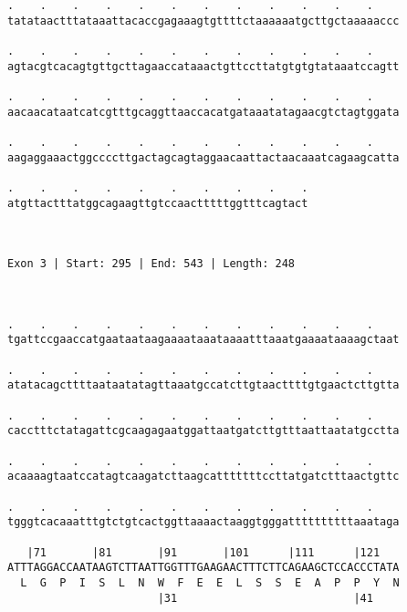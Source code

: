 \documentclass{article}
\begin{document}
\begin{Verbatim}
.    .    .    .    .    .    .    .    .    .    .    .    
tatataactttataaattacaccgagaaagtgttttctaaaaaatgcttgctaaaaaccc
                                                            
.    .    .    .    .    .    .    .    .    .    .    .    
agtacgtcacagtgttgcttagaaccataaactgttccttatgtgtgtataaatccagtt
                                                            
.    .    .    .    .    .    .    .    .    .    .    .    
aacaacataatcatcgtttgcaggttaaccacatgataaatatagaacgtctagtggata
                                                            
.    .    .    .    .    .    .    .    .    .    .    .    
aagaggaaactggccccttgactagcagtaggaacaattactaacaaatcagaagcatta
                                                            
.    .    .    .    .    .    .    .    .    .
atgttactttatggcagaagttgtccaactttttggtttcagtact
                                              
                                              
 
Exon 3 | Start: 295 | End: 543 | Length: 248



.    .    .    .    .    .    .    .    .    .    .    .    
tgattccgaaccatgaataataagaaaataaataaaatttaaatgaaaataaaagctaat
                                                            
.    .    .    .    .    .    .    .    .    .    .    .    
atatacagcttttaataatatagttaaatgccatcttgtaacttttgtgaactcttgtta
                                                            
.    .    .    .    .    .    .    .    .    .    .    .    
cacctttctatagattcgcaagagaatggattaatgatcttgtttaattaatatgcctta
                                                            
.    .    .    .    .    .    .    .    .    .    .    .    
acaaaagtaatccatagtcaagatcttaagcatttttttccttatgatctttaactgttc
                                                            
.    .    .    .    .    .    .    .    .    .    .    .    
tgggtcacaaatttgtctgtcactggttaaaactaaggtgggattttttttttaaataga
                                                            
   |71       |81       |91       |101      |111      |121   
ATTTAGGACCAATAAGTCTTAATTGGTTTGAAGAACTTTCTTCAGAAGCTCCACCCTATA
  L  G  P  I  S  L  N  W  F  E  E  L  S  S  E  A  P  P  Y  N
                       |31                           |41    
  

\end{Verbatim}
\end{document}

